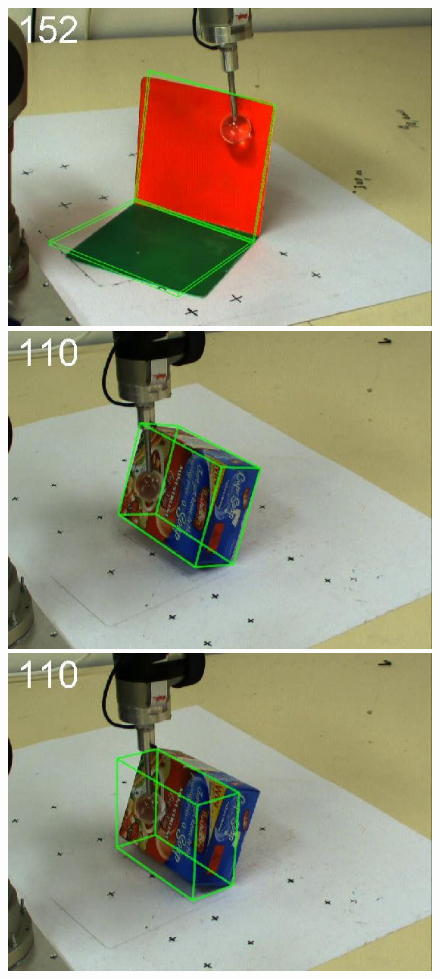 \begin{figure}[htbp]
{\includegraphics[width=\imgAXwid]{images/A1_2exp_876_2}
\includegraphics[width=\imgAXwid]{images/A2_2exp_399_2}
\includegraphics[width=\imgAXwid]{images/A2_LWPR1_399_2}
}
\end{figure}
